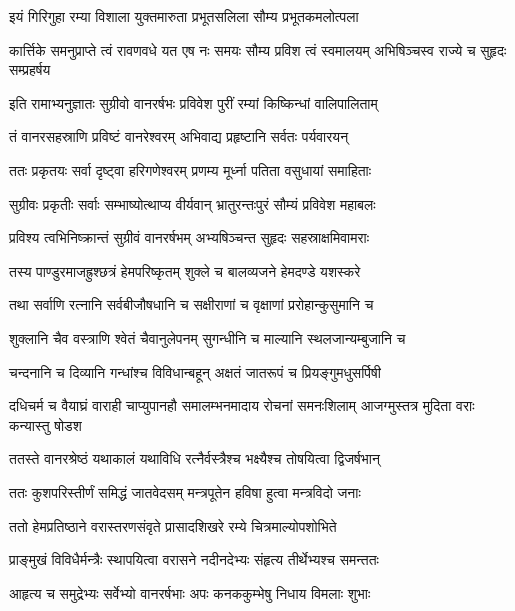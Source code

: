 \twolineshloka
{इयं गिरिगुहा रम्या विशाला युक्तमारुता}
{प्रभूतसलिला सौम्य प्रभूतकमलोत्पला} %

\threelineshloka
{कार्त्तिके समनुप्राप्ते त्वं रावणवधे यत}
{एष नः समयः सौम्य प्रविश त्वं स्वमालयम्}
{अभिषिञ्चस्व राज्ये च सुहृदः सम्प्रहर्षय} %

\twolineshloka
{इति रामाभ्यनुज्ञातः सुग्रीवो वानरर्षभः}
{प्रविवेश पुरीं रम्यां किष्किन्धां वालिपालिताम्} %

\twolineshloka
{तं वानरसहस्राणि प्रविष्टं वानरेश्वरम्}
{अभिवाद्य प्रहृष्टानि सर्वतः पर्यवारयन्} %

\twolineshloka
{ततः प्रकृतयः सर्वा दृष्ट्वा हरिगणेश्वरम्}
{प्रणम्य मूर्ध्ना पतिता वसुधायां समाहिताः} %

\twolineshloka
{सुग्रीवः प्रकृतीः सर्वाः सम्भाष्योत्थाप्य वीर्यवान्}
{भ्रातुरन्तःपुरं सौम्यं प्रविवेश महाबलः} %

\twolineshloka
{प्रविश्य त्वभिनिष्क्रान्तं सुग्रीवं वानरर्षभम्}
{अभ्यषिञ्चन्त सुहृदः सहस्राक्षमिवामराः} %

\twolineshloka
{तस्य पाण्डुरमाजह्रुश्छत्रं हेमपरिष्कृतम्}
{शुक्ले च बालव्यजने हेमदण्डे यशस्करे} %

\twolineshloka
{तथा सर्वाणि रत्नानि सर्वबीजौषधानि च}
{सक्षीराणां च वृक्षाणां प्ररोहान्कुसुमानि च} %

\twolineshloka
{शुक्लानि चैव वस्त्राणि श्वेतं चैवानुलेपनम्}
{सुगन्धीनि च माल्यानि स्थलजान्यम्बुजानि च} %

\twolineshloka
{चन्दनानि च दिव्यानि गन्धांश्च विविधान्बहून्}
{अक्षतं जातरूपं च प्रियङ्गुमधुसर्पिषी} %

\threelineshloka
{दधिचर्म च वैयाघ्रं वाराही चाप्युपानहौ}
{समालम्भनमादाय रोचनां समनःशिलाम्}
{आजग्मुस्तत्र मुदिता वराः कन्यास्तु षोडश} %

\twolineshloka
{ततस्ते वानरश्रेष्ठं यथाकालं यथाविधि}
{रत्नैर्वस्त्रैश्च भक्ष्यैश्च तोषयित्वा द्विजर्षभान्} %

\twolineshloka
{ततः कुशपरिस्तीर्णं समिद्धं जातवेदसम्}
{मन्त्रपूतेन हविषा हुत्वा मन्त्रविदो जनाः} %

\twolineshloka
{ततो हेमप्रतिष्ठाने वरास्तरणसंवृते}
{प्रासादशिखरे रम्ये चित्रमाल्योपशोभिते} %

\twolineshloka
{प्राङ्मुखं विविधैर्मन्त्रैः स्थापयित्वा वरासने}
{नदीनदेभ्यः संहृत्य तीर्थेभ्यश्च समन्ततः} %

\twolineshloka
{आहृत्य च समुद्रेभ्यः सर्वेभ्यो वानरर्षभाः}
{अपः कनककुम्भेषु निधाय विमलाः शुभाः} %

